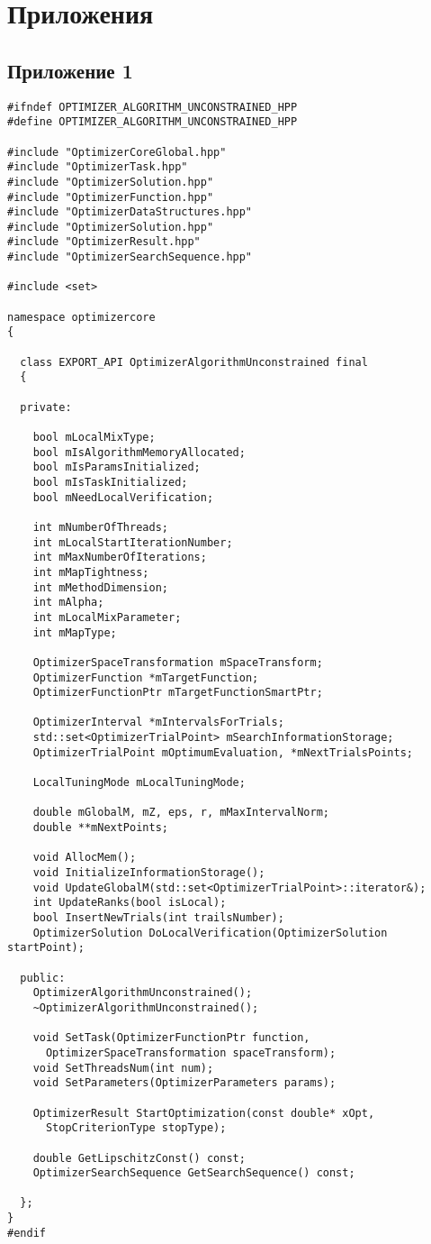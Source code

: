 \section{Приложения}
\subsection{Приложение 1}
\label{attach1}

\begin{lstlisting}[frame=single]
#ifndef OPTIMIZER_ALGORITHM_UNCONSTRAINED_HPP
#define OPTIMIZER_ALGORITHM_UNCONSTRAINED_HPP

#include "OptimizerCoreGlobal.hpp"
#include "OptimizerTask.hpp"
#include "OptimizerSolution.hpp"
#include "OptimizerFunction.hpp"
#include "OptimizerDataStructures.hpp"
#include "OptimizerSolution.hpp"
#include "OptimizerResult.hpp"
#include "OptimizerSearchSequence.hpp"

#include <set>

namespace optimizercore
{

  class EXPORT_API OptimizerAlgorithmUnconstrained final
  {

  private:

    bool mLocalMixType;
    bool mIsAlgorithmMemoryAllocated;
    bool mIsParamsInitialized;
    bool mIsTaskInitialized;
    bool mNeedLocalVerification;

    int mNumberOfThreads;
    int mLocalStartIterationNumber;
    int mMaxNumberOfIterations;
    int mMapTightness;
    int mMethodDimension;
    int mAlpha;
    int mLocalMixParameter;
    int mMapType;

    OptimizerSpaceTransformation mSpaceTransform;
    OptimizerFunction *mTargetFunction;
    OptimizerFunctionPtr mTargetFunctionSmartPtr;

    OptimizerInterval *mIntervalsForTrials;
    std::set<OptimizerTrialPoint> mSearchInformationStorage;
    OptimizerTrialPoint mOptimumEvaluation, *mNextTrialsPoints;

    LocalTuningMode mLocalTuningMode;

    double mGlobalM, mZ, eps, r, mMaxIntervalNorm;
    double **mNextPoints;

    void AllocMem();
    void InitializeInformationStorage();
    void UpdateGlobalM(std::set<OptimizerTrialPoint>::iterator&);
    int UpdateRanks(bool isLocal);
    bool InsertNewTrials(int trailsNumber);
    OptimizerSolution DoLocalVerification(OptimizerSolution startPoint);

  public:
    OptimizerAlgorithmUnconstrained();
    ~OptimizerAlgorithmUnconstrained();

    void SetTask(OptimizerFunctionPtr function,
      OptimizerSpaceTransformation spaceTransform);
    void SetThreadsNum(int num);
    void SetParameters(OptimizerParameters params);

    OptimizerResult StartOptimization(const double* xOpt,
      StopCriterionType stopType);

    double GetLipschitzConst() const;
    OptimizerSearchSequence GetSearchSequence() const;

  };
}
#endif
\end{lstlisting}
